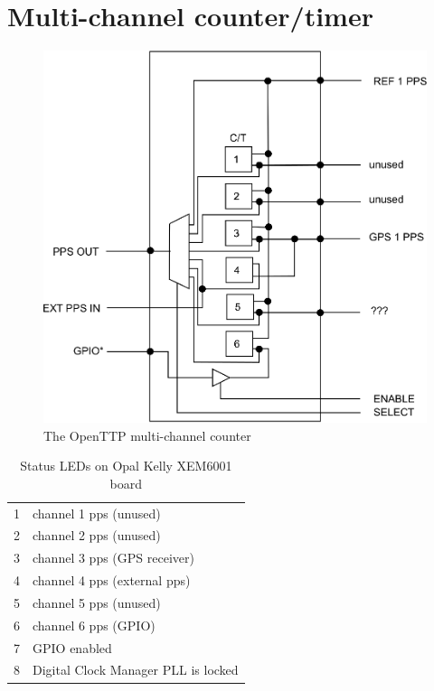 
\section{Multi-channel counter/timer}

\begin{figure}
\centerline{\includegraphics{figures/ottpcounter.eps}}
\caption{The OpenTTP multi-channel counter}
\end{figure}

\begin{table}
\begin{center}
\begin{tabular}{ll}
1 & channel 1 pps (unused)\\
2 & channel 2 pps (unused) \\
3 & channel 3 pps (GPS receiver)\\
4 & channel 4 pps (external pps)\\
5 & channel 5 pps (unused)\\
6 & channel 6 pps (GPIO)\\
7 & GPIO enabled\\
8 & Digital Clock Manager PLL is locked\\
\end{tabular}
\end{center}
\caption{Status LEDs on Opal Kelly XEM6001 board}
\end{table}